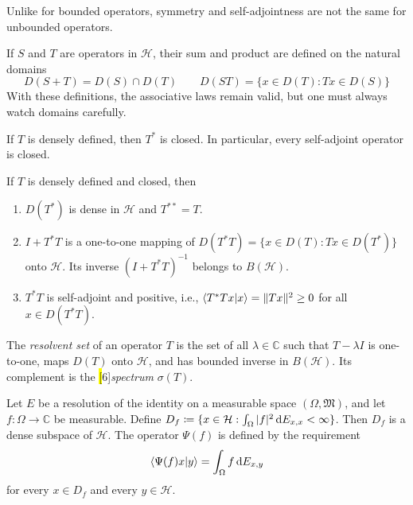 Unlike for bounded operators, symmetry and self-adjointness are not the same for unbounded operators.

If $S$ and $T$ are operators in $\mathcal H$, their sum and product are defined on the natural domains
\[
D(S+T) = D(S)\cap D(T)
\qquad
D(ST) = \{x \in D(T) : Tx \in D(S)\}
\]
With these definitions, the associative laws remain valid, but one must always watch domains carefully.

\begin{theorem}
If $T$ is densely defined, then $T^*$ is closed.
In particular, every self-adjoint operator is closed.
\end{theorem}

\begin{theorem}
If $T$ is densely defined and closed, then 
\begin{enumerate}[label=(\roman*)]
\item
$D(T^*)$ is dense in $\mathcal H$ and
\(
T^{**} = T
\).
\item
\(
I + T^*T
\)
is a one-to-one mapping of
\(
D(T^*T)=\{x\in D(T): Tx\in D(T^*)\}
\)
onto $\mathcal H$.
Its inverse
\(
(I+T^*T)^{-1}
\)
belongs to $B(\mathcal H)$.
\item
$T^*T$ is self-adjoint and positive, i.e.,
\(
\braket{T^*Tx | x} = \|Tx\|^2 \ge 0
\)
for all $x \in D(T^*T)$.
\qedhere
\end{enumerate}
\end{theorem}

\begin{definition}\label{def:spectrum-unbounded-operator}
The \emph{resolvent set} of an operator $T$ is the set of all $\lambda \in \mathbb C$ such that
\(
T-\lambda I
\)
is one-to-one, maps $D(T)$ onto $\mathcal H$, and has bounded inverse in $B(\mathcal H)$.
Its complement is the \hl[6]{\emph{spectrum} $\sigma(T)$}.
\end{definition}

\begin{definition}\label{def:domain-of-Psi}
Let $E$ be a resolution of the identity on a measurable space $(\Omega,\mathfrak M)$, and let
\(
f \colon \Omega \to \mathbb C
\)
be measurable.
Define
\(
D_f \coloneq \{x \in \mathcal H : \int_\Omega |f|^2 \, \mathrm{d} E_{x,x} < \infty \}
\).
Then $D_f$ is a dense subspace of $\mathcal H$.
The operator $\Psi(f)$ is defined by the requirement
\[
\braket{\Psi(f)x | y}
=
\int_\Omega f \, \mathrm{d} E_{x,y}
\]
for every $x \in D_f$ and every $y \in \mathcal H$.
\end{definition}

